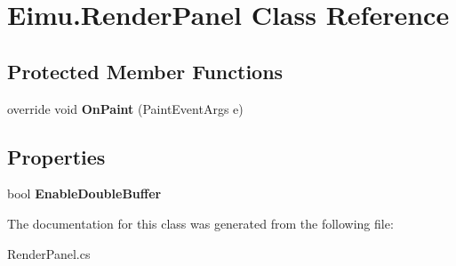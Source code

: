 \hypertarget{class_eimu_1_1_render_panel}{
\section{Eimu.RenderPanel Class Reference}
\label{class_eimu_1_1_render_panel}
}
\subsection*{Protected Member Functions}
\begin{DoxyCompactItemize}
\item 
\hypertarget{class_eimu_1_1_render_panel_ac5a31faac41ead94c3e659673f496ab3}{
override void {\bfseries OnPaint} (PaintEventArgs e)}
\label{class_eimu_1_1_render_panel_ac5a31faac41ead94c3e659673f496ab3}

\end{DoxyCompactItemize}
\subsection*{Properties}
\begin{DoxyCompactItemize}
\item 
\hypertarget{class_eimu_1_1_render_panel_ad772742be91f962df327ed0d3d0bc828}{
bool {\bfseries EnableDoubleBuffer}}
\label{class_eimu_1_1_render_panel_ad772742be91f962df327ed0d3d0bc828}

\end{DoxyCompactItemize}


The documentation for this class was generated from the following file:\begin{DoxyCompactItemize}
\item 
RenderPanel.cs\end{DoxyCompactItemize}
